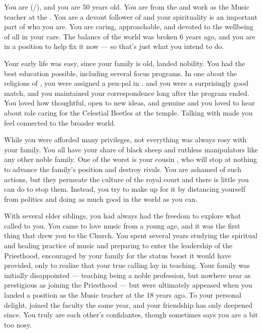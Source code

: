 \documentclass[char]{GL2020}
\begin{document}
\name{\cMusic{}}

You are \cMusic{\full} (\cMusic{\they}/\cMusic{\them}), and you are 50 years old. You are from the \pFarm{} and work as the Music teacher at the \pSchool{}. You are a devout follower of \cFarmGod{} and your spirituality is an important part of who you are. You are caring, approachable, and devoted to the wellbeing of all in your care. The balance of the world was broken 6 years ago, and you are in a position to help fix it now — so that's just what you intend to do.

Your early life was easy, since your family is old, landed nobility. You had the best education possible, including several focus programs. In one about the religions of \pEarth{}, you were assigned a pen-pal in \pTech{}. \cBeetle{\full} and you were a surprisingly good match, and you maintained your correspondence long after the program ended. You loved how thoughtful, open to new ideas, and genuine \cBeetle{\they} \cBeetle{\were} and you loved to hear about \cBeetle{\their} role caring for the Celestial Beetles at the temple. Talking with \cBeetle{\them} made you feel connected to the broader world.   

While you were afforded many privileges, not everything was always rosy with your family. You all have your share of black sheep and ruthless manipulators like any other noble family. One of the worst is your cousin \cEvilNemesis{\full}, who will stop at nothing to advance the family's position and destroy rivals. You are ashamed of such actions, but they permeate the culture of the royal court and there is little you can do to stop them. Instead, you try to make up for it by distancing yourself from \pFarm{} politics and doing as much good in the world as you can. 

With several elder siblings, you had always had the freedom to explore what called to you. You came to love music from a young age, and it was the first thing that drew you to the Church. You spent several years studying the spiritual and healing practice of music and preparing to enter the leadership of the Priesthood, encouraged by your family for the status boost it would have provided, only to realize that your true calling lay in teaching. Your family was initially disappointed — teaching being a noble profession, but nowhere near as prestigious as joining the Priesthood — but were ultimately appeased when you landed a position as the Music teacher at the \pSchool{} 18 years ago. To your personal delight, \cBeetle{} joined the faculty the same year, and your friendship has only deepened since. You truly are each other’s confidantes, though sometimes \cBeetle{}says you are a bit too nosy.  
\end{document}
